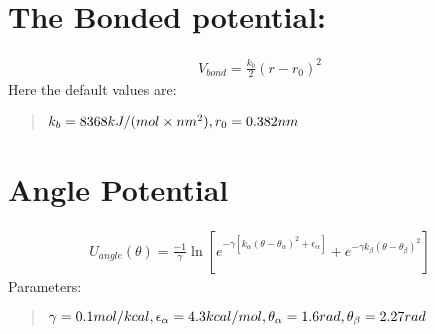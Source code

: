 \documentclass[letterpaper,10pt,english]{sphinxmanual}
\begin{document}
\section{The Bonded potential:}
\label{\detokenize{modules/models:the-bonded-potential}}\begin{equation*}
\begin{split}V_{bond} = \frac{k_b}{2}(r-r_0)^2\end{split}
\end{equation*}
\sphinxAtStartPar
Here the default values are:
\begin{quote}

\sphinxAtStartPar
\(k_b= 8368 kJ/(mol \times nm^2),\\
r_0=0.382 nm\)
\end{quote}


\section{Angle Potential}
\label{\detokenize{modules/models:angle-potential}}\begin{equation*}
\begin{split}U_{angle}(\theta) = \frac{-1}{\gamma}
\ln \left[ e^{ -\gamma[ k_{\alpha} (\theta-\theta_{\alpha})^2+\epsilon_{\alpha} ]} +e^{ -\gamma k_{\beta} (\theta-\theta_{\beta})^2 } \right]\end{split}
\end{equation*}
\sphinxAtStartPar
Parameters:
\begin{quote}

\sphinxAtStartPar
\(\gamma = 0.1 mol/kcal,\\
\epsilon_{\alpha}=4.3 kcal/mol,\\
\theta_{\alpha}=1.6 rad, \\
\theta_{\beta}=2.27 rad\)
\end{quote}
\end{document}
